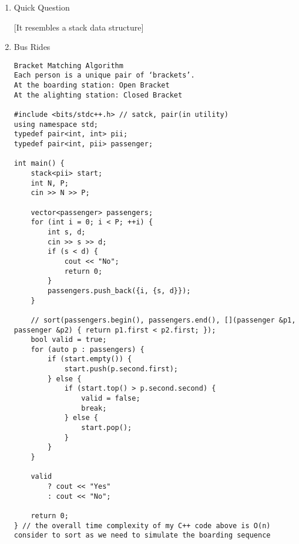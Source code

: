 \documentclass{article}
\begin{document}
\begin{enumerate}[label=(\arabic*)]

\item Quick Question

[It resembles a stack data structure]

\item Bus Rides
\begin{verbatim}
Bracket Matching Algorithm
Each person is a unique pair of ‘brackets’. 
At the boarding station: Open Bracket
At the alighting station: Closed Bracket

#include <bits/stdc++.h> // satck, pair(in utility)
using namespace std;
typedef pair<int, int> pii;
typedef pair<int, pii> passenger;

int main() {
    stack<pii> start;
    int N, P;
    cin >> N >> P;
    
    vector<passenger> passengers;
    for (int i = 0; i < P; ++i) {
        int s, d;
        cin >> s >> d;
        if (s < d) {
            cout << "No";
            return 0;
        }
        passengers.push_back({i, {s, d}});
    }
    
    // sort(passengers.begin(), passengers.end(), [](passenger &p1, passenger &p2) { return p1.first < p2.first; });
    bool valid = true;
    for (auto p : passengers) {
        if (start.empty()) {
            start.push(p.second.first);
        } else {
            if (start.top() > p.second.second) {
                valid = false;
                break;
            } else {
                start.pop();
            }
        }
    }
    
    valid
        ? cout << "Yes"
        : cout << "No";
    
    return 0;
} // the overall time complexity of my C++ code above is O(n) consider to sort as we need to simulate the boarding sequence
\end{verbatim}

\end{enumerate}
\end{document}
